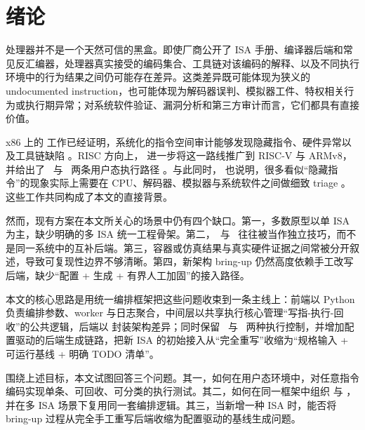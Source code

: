 \chapter{绪论}

处理器并不是一个天然可信的黑盒。即使厂商公开了 ISA 手册、编译器后端和常见反汇编器，处理器真实接受的编码集合、工具链对该编码的解释、以及不同执行环境中的行为结果之间仍可能存在差异。这类差异既可能体现为狭义的 undocumented instruction，也可能体现为解码器误判、模拟器工件、特权相关行为或执行期异常；对系统软件验证、漏洞分析和第三方审计而言，它们都具有直接价值。

x86 上的  工作已经证明，系统化的指令空间审计能够发现隐藏指令、硬件异常以及工具链缺陷 \citep{domas2017breakingx86}。RISC 方向上， 进一步将这一路线推广到 RISC-V 与 ARMv8，并给出了 \ptracebackend\ 与 \memcage\ 两条用户态执行路径 \citep{Dofferhoff_2020}。与此同时， 也说明，很多看似“隐藏指令”的现象实际上需要在 CPU、解码器、模拟器与系统软件之间做细致 triage \citep{Strupe_2020}。这些工作共同构成了本文的直接背景。

然而，现有方案在本文所关心的场景中仍有四个缺口。第一，多数原型以单 ISA 为主，缺少明确的多 ISA 统一工程骨架。第二，\memcage\ 与 \ptracebackend\ 往往被当作独立技巧，而不是同一系统中的互补后端。第三，容器或仿真结果与真实硬件证据之间常被分开叙述，导致可复现性边界不够清晰。第四，新架构 bring-up 仍然高度依赖手工改写后端，缺少“配置 + 生成 + 有界人工加固”的接入路径。

本文的核心思路是用统一编排框架把这些问题收束到一条主线上：前端以 Python 负责编排参数、worker 与日志聚合，中间层以共享执行核心管理“写指-执行-回收”的公共逻辑，后端以  封装架构差异；同时保留 \memcage\ 与 \ptracebackend\ 两种执行控制，并增加配置驱动的后端生成链路，把新 ISA 的初始接入从“完全重写”收缩为“规格输入 + 可运行基线 + 明确 TODO 清单”。


围绕上述目标，本文试图回答三个问题。其一，如何在用户态环境中，对任意指令编码实现单条、可回收、可分类的执行测试。其二，如何在同一框架中组织 \memcage{} 与 \ptracebackend{}，并在多 ISA 场景下复用同一套编排逻辑。其三，当新增一种 ISA 时，能否将 bring-up 过程从完全手工重写后端收缩为配置驱动的基线生成问题。

